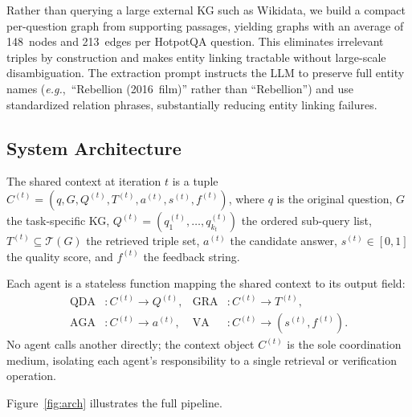 \documentclass[runningheads]{llncs}
\newcommand{\eg}{\emph{e.g.},\xspace}
\newcommand{\calT}{\mathcal{T}}
\begin{document}
Rather than querying a large external KG such as Wikidata, we build a compact
per-question graph from supporting passages, yielding graphs with an average of
148~nodes and 213~edges per HotpotQA question. This eliminates irrelevant
triples by construction and makes entity linking tractable without large-scale
disambiguation. The extraction prompt instructs the LLM to preserve full entity
names (\eg\ ``Rebellion (2016~film)'' rather than ``Rebellion'') and use
standardized relation phrases, substantially reducing entity linking failures.

\subsection{System Architecture}

\begin{definition}
The shared context at iteration $t$ is a tuple
$C^{(t)} = (q, G, Q^{(t)}, T^{(t)}, a^{(t)}, s^{(t)}, f^{(t)})$,
where $q$ is the original question, $G$ the task-specific KG,
$Q^{(t)} = (q_1^{(t)},\ldots,q_{k_t}^{(t)})$ the ordered sub-query list,
$T^{(t)}\subseteq\calT(G)$ the retrieved triple set, $a^{(t)}$ the candidate
answer, $s^{(t)}\in[0,1]$ the quality score, and $f^{(t)}$ the feedback string.
\end{definition}

\begin{definition}
Each agent is a stateless function mapping the shared context to its output field:
\begin{align*}
  \mathrm{QDA}&: C^{(t)} \rightarrow Q^{(t)}, &
  \mathrm{GRA}&: C^{(t)} \rightarrow T^{(t)},\\
  \mathrm{AGA}&: C^{(t)} \rightarrow a^{(t)}, &
  \mathrm{VA} &: C^{(t)} \rightarrow (s^{(t)}, f^{(t)}).
\end{align*}
No agent calls another directly; the context object $C^{(t)}$ is the sole
coordination medium, isolating each agent's responsibility to a single
retrieval or verification operation.
\end{definition}

Figure~\ref{fig:arch} illustrates the full pipeline.
\end{document}
